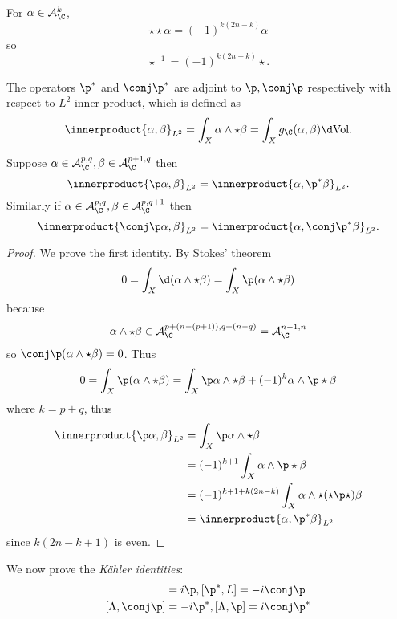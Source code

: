\documentclass[a4paper]{article}
\newcommand{\w}{\wedge} %
\newcommand*{\ip}{\innerproduct}
\begin{document}
\begin{remark}
  For \(\alpha \in \mathcal A_\C^k\),
  \[
    \star \star \alpha = (-1)^{k (2n - k)} \alpha
  \]
  so
  \[
    \star^{-1} = (-1)^{k (2n - k)} \star.
  \]
\end{remark}

The operators \(\p^*\) and \(\conj \p^*\) are adjoint to \(\p, \conj \p\) respectively with respect to \(L^2\) inner product, which is defined as
\[
  \ip{\alpha, \beta}_{L^2}
  = \int_X \alpha \w \star \beta
  = \int_X g_\C(\alpha, \beta) \d \text{Vol}.
\]

\begin{lemma}
  Suppose \(\alpha \in \mathcal A_\C^{p, q}, \beta \in \mathcal A_\C^{p + 1, q}\) then
  \[
    \ip{\p \alpha, \beta}_{L^2} = \ip{\alpha, \p^* \beta}_{L^2}.
  \]
  Similarly if \(\alpha \in \mathcal A_\C^{p, q}, \beta \in \mathcal A_\C^{p, q + 1}\) then
  \[
    \ip{\conj \p \alpha, \beta}_{L^2} = \ip{\alpha, \conj \p^* \beta}_{L^2}.
  \]
\end{lemma}

\begin{proof}
  We prove the first identity. By Stokes' theorem
  \[
    0
    = \int_X \d (\alpha \w \star \beta)
    = \int_X \p (\alpha \w \star \beta)
  \]
  because
  \[
    \alpha \w \star \beta \in \mathcal A_\C^{p + (n - (p + 1)), q + (n - q)} = \mathcal A_\C^{n - 1, n}
  \]
  so \(\conj \p (\alpha \w \star \beta) = 0\). Thus
  \[
    0
    = \int_X \p (\alpha \w \star \beta)
    = \int_X \p\alpha \w \star \beta + (-1)^k \alpha \w \p \star \beta
  \]
  where \(k = p + q\), thus
  \begin{align*}
    \ip{\p \alpha, \beta}_{L^2}
    &= \int_X \p \alpha \w \star \beta \\
    &= (-1)^{k + 1} \int_X \alpha \w \p \star \beta \\
    &= (-1)^{k + 1 + k(2n - k)} \int_X \alpha \w \star (\star \p \star) \beta \\
    &= \ip{\alpha, \p^* \beta}_{L^2}
  \end{align*}
  since \(k(2n - k + 1)\) is even.
\end{proof}

We now prove the \emph{Kähler identities}:
\begin{align*}
  [\conj \p^*, L] &= i \p, [\p^*, L] = -i \conj \p \\
  [\Lambda, \conj \p] &= - i \p^*, [\Lambda, \p] = i\conj \p^*
\end{align*}
\end{document}
